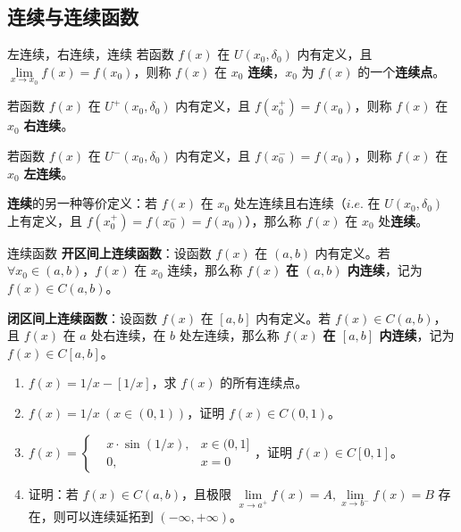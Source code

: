 

\subsection{连续与连续函数}

\begin{definition}{左连续，右连续，连续}
  若函数 $f(x)$ 在 $U(x_0,\delta_0)$ 内有定义，且 $\lim\limits_{x\rightarrow x_0}f(x)=f(x_0)$，则称 $f(x)$ 在 $x_0$ \textbf{连续}，$x_0$ 为 $f(x)$ 的一个\textbf{连续点}。

  若函数 $f(x)$ 在 $U^+(x_0,\delta_0)$ 内有定义，且 $f(x_0^+)=f(x_0)$，则称 $f(x)$ 在 $x_0$ \textbf{右连续}。

  若函数 $f(x)$ 在 $U^-(x_0,\delta_0)$ 内有定义，且 $f(x_0^-)=f(x_0)$，则称 $f(x)$ 在 $x_0$ \textbf{左连续}。
\end{definition}

  \textbf{连续}的另一种等价定义：若 $f(x)$ 在 $x_0$ 处左连续且右连续（$i.e. $ 在 $U(x_0,\delta_0)$ 上有定义，且 $f(x_0^+)=f(x_0^-)=f(x_0)$），那么称 $f(x)$ 在 $x_0$ 处\textbf{连续}。

\begin{exercise}{连续函数}
\textbf{开区间上连续函数}：设函数 $f(x)$ 在 $(a,b)$ 内有定义。若 $\forall x_0\in(a,b)$，$f(x)$ 在 $x_0$ 连续，那么称 $f(x)$ \textbf{在 $(a,b)$ 内连续}，记为 $f(x)\in C(a,b)$。

\textbf{闭区间上连续函数}：设函数 $f(x)$ 在 $[a,b]$ 内有定义。若 $f(x)\in C(a,b)$，且 $f(x)$ 在 $a$ 处右连续，在 $b$ 处左连续，那么称 $f(x)$ \textbf{在 $[a,b]$ 内连续}，记为 $f(x)\in C[a,b]$。
\end{exercise}

\begin{exercise}{}
\begin{enumerate}
\item $f(x)=1/x-[1/x]$，求 $f(x)$ 的所有连续点。
\item $f(x)=1/x\ (x\in(0,1))$，证明 $f(x)\in C(0,1)$。
\item $f(x)=\left\{\begin{aligned}&x\cdot \sin(1/x),&x\in(0,1]\\&0,&x=0 \end{aligned}\right.$，证明 $f(x)\in C[0,1]$。
\item 证明：若 $f(x)\in C(a,b)$，且极限 $\lim\limits_{x\rightarrow a^+}f(x)=A,\lim\limits_{x\rightarrow b^-}f(x)=B$ 存在，则可以连续延拓到 $(-\infty,+\infty)$。
\end{enumerate}
\end{exercise}


